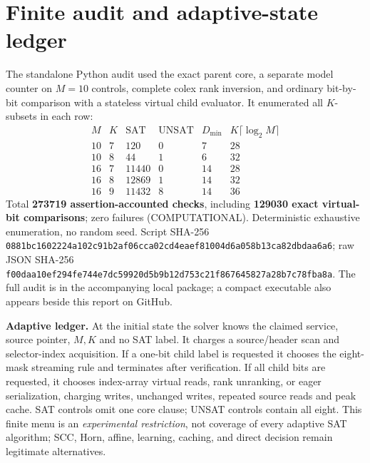 \documentclass[11pt]{article}
\begin{document}
\section{Finite audit and adaptive-state ledger}
The standalone Python audit used the exact parent core, a separate model counter on $M=10$ controls, complete colex rank inversion, and ordinary bit-by-bit comparison with a stateless virtual child evaluator. It enumerated all $K$-subsets in each row:
\[
\begin{array}{rrrrrr}
M&K&\mathrm{SAT}&\mathrm{UNSAT}&D_{\min}&K\lceil\log_2 M\rceil\\
10&7&120&0&7&28\\
10&8&44&1&6&32\\
16&7&11440&0&14&28\\
16&8&12869&1&14&32\\
16&9&11432&8&14&36
\end{array}
\]
Total \textbf{273719 assertion-accounted checks}, including \textbf{129030 exact virtual-bit comparisons}; zero failures (COMPUTATIONAL). Deterministic exhaustive enumeration, no random seed. Script SHA-256 \texttt{0881bc1602224a102c91b2af06cca02cd4eaef81004d6a058b13ca82dbdaa6a6}; raw JSON SHA-256 \texttt{f00daa10ef294fe744e7dc59920d5b9b12d753c21f867645827a28b7c78fba8a}. The full audit is in the accompanying local package; a compact executable also appears beside this report on GitHub.
\par\noindent\textbf{Adaptive ledger.} At the initial state the solver knows the claimed service, source pointer, $M,K$ and no SAT label. It charges a source/header scan and selector-index acquisition. If a one-bit child label is requested it chooses the eight-mask streaming rule and terminates after verification. If all child bits are requested, it chooses index-array virtual reads, rank unranking, or eager serialization, charging writes, unchanged writes, repeated source reads and peak cache. SAT controls omit one core clause; UNSAT controls contain all eight. This finite menu is an \emph{experimental restriction}, not coverage of every adaptive SAT algorithm; SCC, Horn, affine, learning, caching, and direct decision remain legitimate alternatives.
\end{document}
